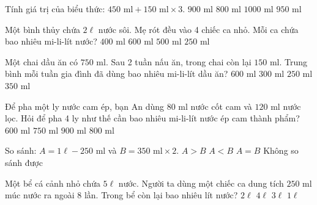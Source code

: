 \begin{ex} %
Tính giá trị của biểu thức: $450\text{ ml} + 150\text{ ml} \times 3$.
\choice
{\True $900\text{ ml}$}
{$800\text{ ml}$}
{$1000\text{ ml}$}
{$950\text{ ml}$}
\end{ex}

\begin{ex} %
Một bình thủy chứa $2\ell$ nước sôi. Mẹ rót đều vào 4 chiếc ca nhỏ. Mỗi ca chứa bao nhiêu mi-li-lít nước?
\choice
{$400\text{ ml}$}
{$600\text{ ml}$}
{\True $500\text{ ml}$}
{$250\text{ ml}$}
\end{ex}

\begin{ex} %
Một chai dầu ăn có $750\text{ ml}$. Sau 2 tuần nấu ăn, trong chai còn lại $150\text{ ml}$. Trung bình mỗi tuần gia đình đã dùng bao nhiêu mi-li-lít dầu ăn?
\choice
{$600\text{ ml}$}
{\True $300\text{ ml}$}
{$250\text{ ml}$}
{$350\text{ ml}$}
\end{ex}

\begin{ex} %
Để pha một ly nước cam ép, bạn An dùng $80\text{ ml}$ nước cốt cam và $120\text{ ml}$ nước lọc. Hỏi để pha 4 ly như thế cần bao nhiêu mi-li-lít nước ép cam thành phẩm?
\choice
{$600\text{ ml}$}
{$750\text{ ml}$}
{$900\text{ ml}$}
{\True $800\text{ ml}$}
\end{ex}

\begin{ex} %
So sánh: $A = 1\ell - 250\text{ ml}$ và $B = 350\text{ ml} \times 2$.
\choice
{\True $A > B$}
{$A < B$}
{$A = B$}
{Không so sánh được}
\end{ex}

\begin{ex} %
Một bể cá cảnh nhỏ chứa $5\ell$ nước. Người ta dùng một chiếc ca dung tích $250\text{ ml}$ múc nước ra ngoài 8 lần. Trong bể còn lại bao nhiêu lít nước?
\choice
{$2\ell$}
{$4\ell$}
{\True $3\ell$}
{$1\ell$}
\end{ex}

